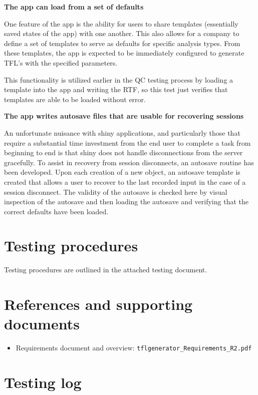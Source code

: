 \documentclass{article}
\newcommand{\testinglog}{usability-enhancements-testing-log.pdf}
\begin{document}
{\bf The app can load from a set of defaults}

One feature of the app is the ability for users to share templates (essentially saved states of the app) with one another.  This also allows for a company to define a set of templates to serve as defaults for specific analysis types.  From these templates, the app is expected to be immediately configured to generate TFL's with the specified parameters.

This functionality is utilized earlier in the QC testing process by loading a template into the app and writing the RTF, so this test just verifies that templates are able to be loaded without error.

{\bf The app writes autosave files that are usable for recovering sessions}

An unfortunate nuisance with shiny applications, and particularly those that require a substantial time investment from the end user to complete a task from beginning to end is that shiny does not handle disconnections from the server gracefully.  To assist in recovery from session disconnects, an autosave routine has been developed.  Upon each creation of a new object, an autosave template is created that allows a user to recover to the last recorded input in the case of a session disconnect.  The validity of the autosave is checked here by visual inspection of the autosave and then loading the autosave and verifying that the correct defaults have been loaded.

\section*{Testing procedures}

Testing procedures are outlined in the attached testing document.


\section*{References and supporting documents}

\begin{itemize}
 \item Requirements document and overview: \verb=tflgenerator_Requirements_R2.pdf=
\end{itemize}

\section*{Testing log}


\end{document}
